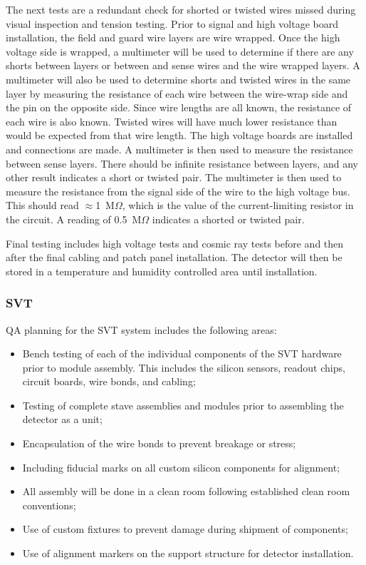 The next tests are a redundant check for shorted or twisted wires missed 
during visual inspection and tension testing.  Prior to signal and high 
voltage board installation, the field and guard wire layers are wire wrapped. 
Once the high voltage side is wrapped, a multimeter will be used to determine 
if there are any shorts between layers or between and sense wires and the 
wire wrapped layers.  A multimeter will also be used to determine shorts and 
twisted wires in the same layer by measuring the resistance of each wire 
between the wire-wrap side and the pin on the opposite side. Since wire 
lengths are all known, the resistance of each wire is also known. Twisted 
wires will have much lower resistance than would be expected from that 
wire length.  The high voltage boards are installed and connections are made. 
A multimeter is then used to measure the resistance between sense layers. 
There should be infinite resistance between layers, and any other result 
indicates a short or twisted pair. The multimeter is then used to measure 
the resistance from the signal side of the wire to the high voltage bus. 
This should read $\approx$1~M$\Omega$, which is the value of the  
current-limiting resistor in the circuit.  A reading of 0.5~M$\Omega$ 
indicates a shorted or twisted pair.

Final testing includes high voltage tests and cosmic ray tests before and 
then after the final cabling and patch panel installation. The detector will 
then be stored in a temperature and humidity controlled area until 
installation. 

\subsubsection{SVT}

QA planning for the SVT system includes the following areas:

\begin{itemize}

\item Bench testing of each of the individual components of the SVT hardware
prior to module assembly.  This includes the silicon sensors, readout
chips, circuit boards, wire bonds, and cabling;

\item Testing of complete stave assemblies and modules prior to assembling
the detector as a unit;

\item Encapsulation of the wire bonds to prevent breakage or stress;

\item Including fiducial marks on all custom silicon components for alignment;

\item All assembly will be done in a clean room following established clean
room conventions;

\item Use of custom fixtures to prevent damage during shipment of components;

\item Use of alignment markers on the support structure for detector 
installation.
\end{itemize}

